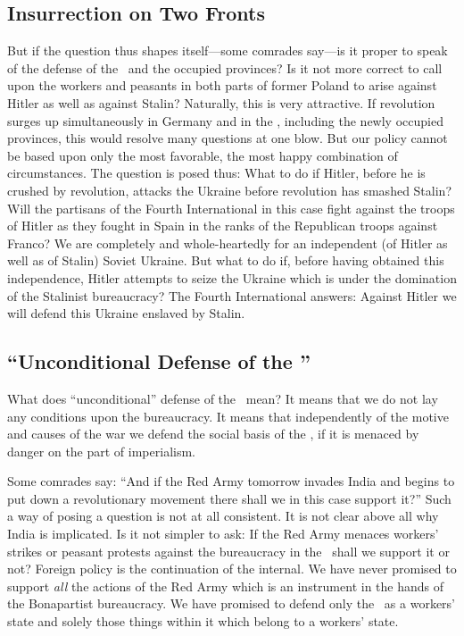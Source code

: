 \subsection*{Insurrection on Two Fronts}

But if the question thus shapes itself---some comrades say---is it proper to speak of the defense of the \USSR\ and the occupied provinces? Is it not more correct to call upon the workers and peasants in both parts of former Poland to arise against Hitler as well as against Stalin? Naturally, this is very attractive. If revolution surges up simultaneously in Germany and in the \USSR, including the newly occupied provinces, this would resolve many questions at one blow. But our policy cannot be based upon only the most favorable, the most happy combination of circumstances. The question is posed thus: What to do if Hitler, before he is crushed by revolution, attacks the Ukraine before revolution has smashed Stalin? Will the partisans of the Fourth International in this case fight against the troops of Hitler as they fought in Spain in the ranks of the Republican troops against Franco? We are completely and whole-heartedly for an independent (of Hitler as well as of Stalin) Soviet Ukraine. But what to do if, before having obtained this independence, Hitler attempts to seize the Ukraine which is under the domination of the Stalinist bureaucracy? The Fourth International answers: Against Hitler we will defend this Ukraine enslaved by Stalin.
\nowidow

\subsection*{“Unconditional Defense of the \USSR”}

What does “unconditional” defense of the \USSR\ mean? It means that we do not lay any conditions upon the bureaucracy. It means that independently of the motive and causes of the war we defend the social basis of the \USSR, if it is menaced by danger on the part of imperialism.

Some comrades say: “And if the Red Army tomorrow invades India and begins to put down a revolutionary movement there shall we in this case support it?” Such a way of posing a question is not at all consistent. It is not clear above all why India is implicated. Is it not simpler to ask: If the Red Army menaces workers’ strikes or peasant protests against the bureaucracy in the \USSR\ shall we support it or not? Foreign policy is the continuation of the internal. We have never promised to support \emph{all} the actions of the Red Army which is an instrument in the hands of the Bonapartist bureaucracy. We have promised to defend only the \USSR\ as a workers’ state and solely those things within it which belong to a workers’ state.

